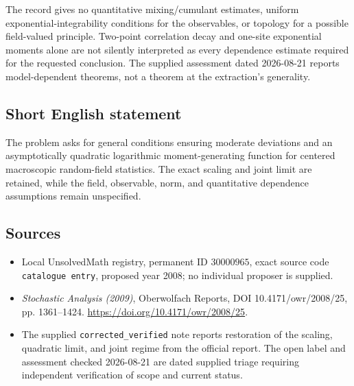 \documentclass[11pt]{article}
\begin{document}
The record gives no quantitative mixing/cumulant estimates, uniform exponential-integrability conditions for the observables, or topology for a possible field-valued principle. Two-point correlation decay and one-site exponential moments alone are not silently interpreted as every dependence estimate required for the requested conclusion. The supplied assessment dated 2026-08-21 reports model-dependent theorems, not a theorem at the extraction's generality.
\subsection{Short English statement}
The problem asks for general conditions ensuring moderate deviations and an asymptotically quadratic logarithmic moment-generating function for centered macroscopic random-field statistics. The exact scaling and joint limit are retained, while the field, observable, norm, and quantitative dependence assumptions remain unspecified.
\subsection{Sources}
\begin{itemize}
\item Local UnsolvedMath registry, permanent ID \(30000965\), exact source code \texttt{catalogue entry}, proposed year 2008; no individual proposer is supplied.
\item \emph{Stochastic Analysis (2009)}, Oberwolfach Reports, DOI 10.4171/owr/2008/25, pp. 1361--1424. \url{https://doi.org/10.4171/owr/2008/25}.
\item The supplied \texttt{corrected\_verified} note reports restoration of the scaling, quadratic limit, and joint regime from the official report. The open label and assessment checked 2026-08-21 are dated supplied triage requiring independent verification of scope and current status.
\end{itemize}
\end{document}
